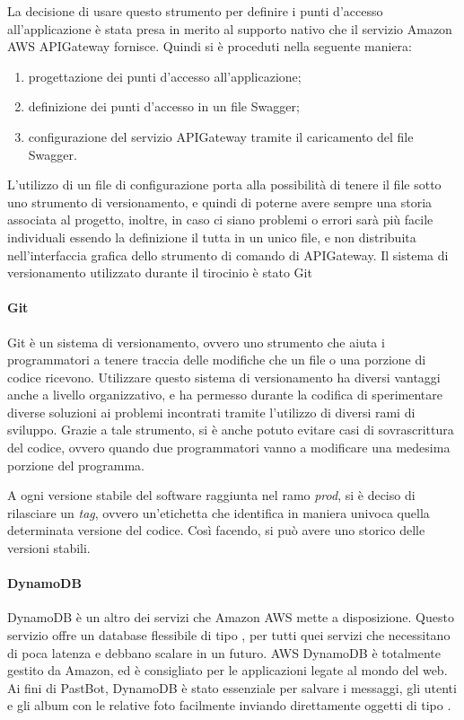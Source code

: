 La decisione di usare questo strumento per definire i punti d'accesso
all'applicazione è stata presa in merito al supporto nativo che il servizio
Amazon AWS APIGateway fornisce. Quindi si è proceduti nella seguente maniera:
\begin{enumerate}
  \item progettazione dei punti d'accesso all'applicazione;
  \item definizione dei punti d'accesso in un file Swagger;
  \item configurazione del servizio APIGateway tramite il caricamento del file
Swagger.
\end{enumerate}


L'utilizzo di un file di configurazione porta alla possibilità di
tenere il file sotto uno strumento di versionamento, e quindi di poterne avere
sempre una storia associata al progetto, inoltre, in caso ci siano problemi o
errori sarà più facile individuali essendo la definizione il tutta in un unico
file, e non distribuita nell'interfaccia grafica dello strumento di comando di
APIGateway.
Il sistema di versionamento utilizzato durante il tirocinio è stato Git


\paragraph*{Git}
\label{tecnologie:git}
Git è un sistema di versionamento, ovvero uno strumento che aiuta i
programmatori a tenere traccia delle modifiche che un file o una porzione di
codice ricevono. Utilizzare questo sistema di versionamento ha diversi vantaggi
anche a livello organizzativo, e ha permesso durante la codifica di
sperimentare diverse soluzioni ai problemi incontrati tramite l'utilizzo di
diversi rami di sviluppo. Grazie a tale strumento, si è anche potuto evitare
casi di sovrascrittura del codice, ovvero quando due programmatori vanno a
modificare una medesima porzione del programma.

A ogni versione stabile del software raggiunta nel ramo \textit{prod}, si è
deciso di rilasciare un \textit{tag}, ovvero un'etichetta che identifica in
maniera univoca quella determinata versione del codice. Così facendo, si può
avere uno storico delle versioni stabili.

\paragraph*{DynamoDB}
DynamoDB è un altro dei servizi che Amazon AWS mette a disposizione. Questo
servizio offre un database flessibile di tipo , per tutti
quei servizi che necessitano di poca latenza e debbano scalare in un futuro.
AWS DynamoDB è totalmente gestito da Amazon, ed è consigliato per le
applicazioni legate al mondo del web.
Ai fini di PastBot, DynamoDB è stato essenziale per salvare i messaggi, gli
utenti e gli album con le relative foto facilmente inviando direttamente
oggetti di tipo .

